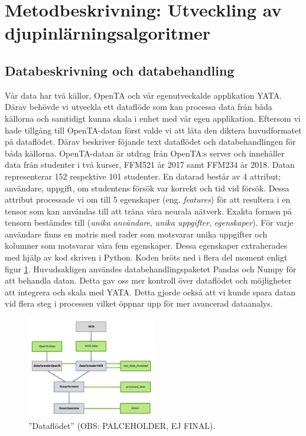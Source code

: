 \section{Metodbeskrivning: Utveckling av djupinlärningsalgoritmer}

\subsection{Databeskrivning och databehandling}
Vår data har två källor, OpenTA och vår egenutveckalde applikation YATA. Därav behövde vi utveckla ett dataflöde som kan processa data från båda källorna och samtidigt kunna skala i enhet med vår egen applikation. Eftersom vi hade tillgång till OpenTA-datan först valde vi att låta den diktera huvudformatet på dataflödet. Därav beskriver föjande text dataflödet och databehandlingen för båda källorna. OpenTA-datan är utdrag från OpenTA:s server och innehåller data från studenter i två kurser, FFM521 år 2017 samt FFM234 år 2018. Datan representerar 152 respektive 101 studenter. En datarad består av 4 attribut; användare, uppgift, om studentens försök var korrekt och tid vid försök. Dessa attribut processade vi om till 5 egenskaper (eng. \textit{features}) för att resultera i en tensor som kan användas till att träna våra neurala nätverk. Exakta formen på tensorn bestämdes till (\textit{unika användare}, \textit{unika uppgifter}, \textit{egenskaper}). För varje användare finns en matris med rader som  motsvarar unika uppgifter och kolumner som motsvarar våra fem egenskaper. 
Dessa egenskaper extraherades med hjälp av kod skriven i Python. Koden bröts ned i flera del moment enligt figur \ref{fig:dataflow}. Huvudsakligen användes databehandlingspaketet Pandas och Numpy för att behandla datan. Detta gav oss mer kontroll över dataflödet och möjligheter att integrera och skala med YATA. Detta gjorde också att vi kunde spara datan vid flera steg i processen vilket öppnar upp för mer avancerad dataanalys.

\begin{figure}[H]
    \centering
    \includegraphics[width=0.5\textwidth]{images/methodpictures/dataflow.png}
    \caption{''Dataflödet'' (OBS: PALCEHOLDER, EJ FINAL).}
    \label{fig:dataflow}
\end{figure}


